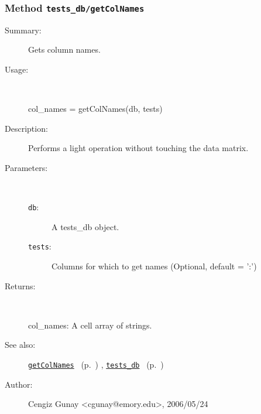 \subsubsection[Method \texttt{getColNames}]{Method \texttt{tests\_db/getColNames}}%
%
\label{ref_tests_db__getColNames}%
\hypertarget{ref_tests_db__getColNames}{}%
\begin{description}
\item[Summary:]Gets column names.
%
\item[Usage:]~%
\begin{lyxcode}%
col\_names = getColNames(db, tests)
%
\end{lyxcode}%
%
\item[Description:]%
Performs a light operation without touching the data matrix.
\item[Parameters:]~
\begin{description}%
\item[\texttt{db}:]
 A tests\_db object.
\item[\texttt{tests}:]
 Columns for which to get names (Optional, default = ':')
\end{description}%
%
\item[Returns:
]~

	col\_names: A cell array of strings.
%
%
\item[See also:]%
\hyperlink{ref_getColNames}{\texttt{getColNames}}%
\ (p.~\pageref{ref_getColNames})%
%
, \hyperlink{ref_tests_db}{\texttt{tests\_db}}%
\ (p.~\pageref{ref_tests_db})%
%
%
\item[Author:]%
Cengiz Gunay <cgunay@emory.edu>, 2006/05/24
%
\end{description}
\methodline%

